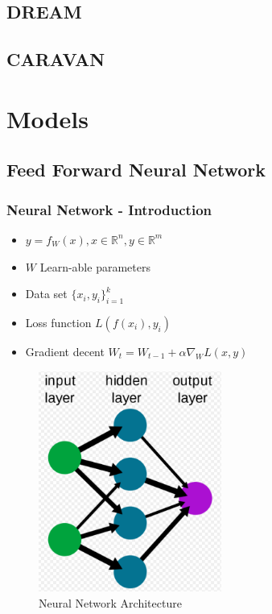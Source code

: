 \documentclass[12pt]{report}
\begin{document}
\subsection{DREAM}
\subsection{CARAVAN}
\newpage
\section{Models}
\subsection{Feed Forward Neural Network}

\subsubsection{Neural Network - Introduction}
\begin{itemize}
	\item $y = f_{W}(x), x \in \mathbb{R}^n, y \in \mathbb{R}^m$ 
	\item $W$ Learn-able parameters
	\item Data set $\{x_i, y_i \}_{i=1}^k$
	\item Loss function $L(f(x_i), y_i)$
	\item Gradient decent $W_t = W_{t-1} + \alpha \nabla_{W}L(x,y) $ 
\end{itemize}

\begin{figure}[H]\centering\includegraphics[width=6cm]{FFNN.png}\caption{Neural Network Architecture}\end{figure}

\newpage
\end{document}
